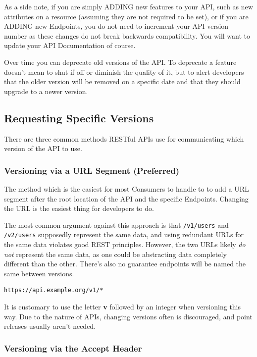 \documentclass{book}
\begin{document}
As a side note, if you are simply ADDING new features to your API, such as new attributes on a resource (assuming they are not required to be set), or if you are ADDING new Endpoints, you do not need to increment your API version number as these changes do not break backwards compatibility. You will want to update your API Documentation of course.

Over time you can deprecate old versions of the API. To deprecate a feature doesn't mean to shut if off or diminish the quality of it, but to alert developers that the older version will be removed on a specific date and that they should upgrade to a newer version.

\subsection{Requesting Specific Versions}

There are three common methods RESTful APIs use for communicating which version of the API to use.

\subsubsection{Versioning via a URL Segment (Preferred)}

The method which is the easiest for most Consumers to handle to to add a URL segment after the root location of the API and the specific Endpoints. Changing the URL is the easiest thing for developers to do.

The most common argument against this approach is that \texttt{/v1/users} and \texttt{/v2/users} supposedly represent the same data, and using redundant URLs for the same data violates good REST principles. However, the two URLs likely \emph{do not} represent the same data, as one could be abstracting data completely different than the other. There's also no guarantee endpoints will be named the same between versions.

\begin{verbatim}
https://api.example.org/v1/*
\end{verbatim}

It is customary to use the letter \textbf{v} followed by an integer when versioning this way. Due to the nature of APIs, changing versions often is discouraged, and point releases usually aren't needed.

\subsubsection{Versioning via the Accept Header}
\end{document}
